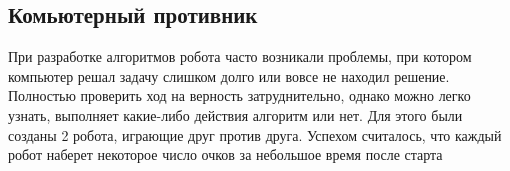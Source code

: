 \documentclass[a4paper,14pt]{article}
\begin{document}
	\subsection{Комьютерный противник}
	При разработке алгоритмов робота часто возникали проблемы, при котором компьютер решал задачу слишком долго или вовсе не находил решение. Полностью проверить ход на верность затруднительно, однако можно легко узнать, выполняет какие-либо действия алгоритм или нет. Для этого были созданы 2 робота, играющие друг против друга. Успехом считалось, что каждый робот наберет некоторое число очков за небольшое время после старта
\end{document}
